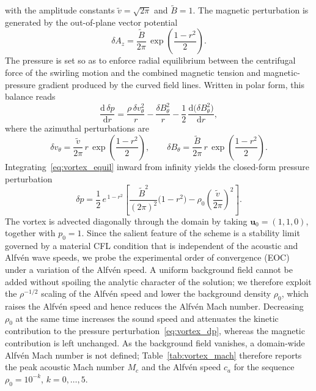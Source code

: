 \documentclass[a4paper,fleqn]{cas-sc}
\theoremstyle{definition}
\theoremstyle{remark}
\begin{document}
%
with the amplitude constants $\tilde{v}=\sqrt{2\pi}$ and $\tilde{B}=1$.
 The magnetic perturbation is generated
by the out-of-plane vector potential
%
\begin{equation}
\delta A_z = \frac{\tilde{B}}{2\pi}\,\exp\!\left(\frac{1-r^{2}}{2}\right).
\label{eq:vortex_Az}
\end{equation}
%
The pressure is set so as to enforce radial equilibrium between the centrifugal
force of the swirling motion and the combined magnetic tension and
magnetic-pressure gradient produced by the curved field lines. Written in polar
form, this balance reads
%
\begin{equation}
\frac{\mathrm{d}\,\delta p}{\mathrm{d}r}
  = \frac{\rho\,\delta v_\theta^{2}}{r}
  - \frac{\delta B_\theta^{2}}{r}
  - \frac{1}{2}\,\frac{\mathrm{d}\bigl(\delta B_\theta^{2}\bigr)}{\mathrm{d}r},
\label{eq:vortex_equil}
\end{equation}
%
where the azimuthal perturbations are
%
\begin{equation}
\delta v_\theta = \frac{\tilde{v}}{2\pi}\,r\,\exp\!\left(\frac{1-r^{2}}{2}\right),
\qquad
\delta B_\theta = \frac{\tilde{B}}{2\pi}\,r\,\exp\!\left(\frac{1-r^{2}}{2}\right).
\label{eq:vortex_theta}
\end{equation}
%
Integrating~\eqref{eq:vortex_equil} inward from infinity yields the closed-form
pressure perturbation
%
\begin{equation}
\delta p = \frac{1}{2}\,e^{\,1-r^{2}}
  \left[\frac{\tilde{B}^{2}}{(2\pi)^{2}}\bigl(1-r^{2}\bigr)
  - \rho_0\left(\frac{\tilde{v}}{2\pi}\right)^{\!2}\right].
\label{eq:vortex_dp}
\end{equation}
%
The vortex is advected diagonally through the domain by taking
$\mathbf{u}_0=(1,1,0)$, together with $p_0=1$. Since the salient feature of the
scheme is a stability limit governed by a material CFL condition that is
independent of the acoustic and Alfv\'en wave speeds, we probe the experimental
order of convergence (EOC) under a variation of the Alfv\'en speed. A uniform
background field cannot be added without spoiling the analytic character of the
solution; we therefore exploit the $\rho^{-1/2}$ scaling of the Alfv\'en speed
and lower the background density $\rho_0$, which raises the Alfv\'en speed and
hence reduces the Alfv\'en Mach number. Decreasing $\rho_0$ at the same time
increases the sound speed and attenuates the kinetic contribution to the
pressure perturbation~\eqref{eq:vortex_dp}, whereas the magnetic contribution is
left unchanged. As the background field vanishes, a domain-wide Alfv\'en Mach
number is not defined; Table~\ref{tab:vortex_mach} therefore reports the peak
acoustic Mach number $M_c$ and the Alfv\'en speed $c_a$
for the sequence $\rho_0=10^{-k}$, $k=0,\dots,5$.
\end{document}
